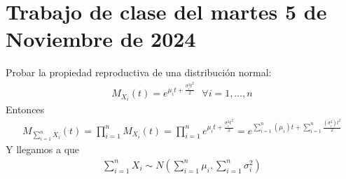 \section{Trabajo de clase del martes 5 de Noviembre de 2024}
 
\begin{ejercicio}
    Probar la propiedad reproductiva de una distribución normal:
    \begin{align*}
        M_{X_i}(t)=e^{\mu_it + \frac{\sigma_i^2 t^2}{2}}\ \ \ \forall i =1,\dots,n
    \end{align*}
    Entonces
    \begin{gather*}
        M_{\sum\limits_{i=1}^n X_i}(t) = \prod\limits_{i=1}^n M_{X_i}(t)= \prod\limits_{i=1}^n e^{\mu_it + \frac{\sigma_i^2 t^2}{2}} = e^{\sum\limits_{i=1}^n (\mu_i)t + \sum\limits_{i=1}^n \frac{(\sigma_i^2)t^2}{2}}
    \end{gather*}
    Y llegamos a que 
    \begin{gather*}
        \sum\limits_{i=1}^n X_i \sim N\left(\sum_{i=1}^n \mu_i , \sum_{i=1}^n \sigma_i^2\right)
    \end{gather*}
\end{ejercicio}